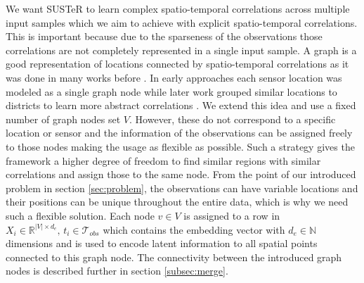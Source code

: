 We want SUSTeR to learn complex spatio-temporal correlations across multiple input samples which we aim to achieve with explicit spatio-temporal correlations.
This is important because due to the sparseness of the observations those correlations are not completely represented in a single input sample.
A graph is a good representation of locations connected by spatio-temporal correlations as it was done in many works before \cite{Zhou20, Yu18, Shao22}.
In early approaches each sensor location was modeled as a single graph node \cite{Li2018} while later work grouped similar locations to districts to learn more abstract correlations \cite{Li2021}. 
We extend this idea and use a fixed number of graph nodes set $V$. 
However, these do not correspond to a specific location or sensor and the information of the observations can be assigned freely to those nodes making the usage as flexible as possible.
Such a strategy gives the framework a higher degree of freedom to find similar regions with similar correlations and assign those to the same node.
From the point of our introduced problem in section \ref{sec:problem}, the observations can have variable locations and their positions can be unique throughout the entire data, which is why we need such a flexible solution.
Each node $v \in V$ is assigned to a row in $X_{i} \in \mathbb{R}^{|V| \times d_e}, \, t_i \in \mathcal{T}_{obs}$ which contains the embedding vector with $d_e \in \mathbb{N} $ dimensions and is used to encode latent information to all spatial points connected to this graph node.
The connectivity between the introduced graph nodes is described further in section \ref{subsec:merge}.

